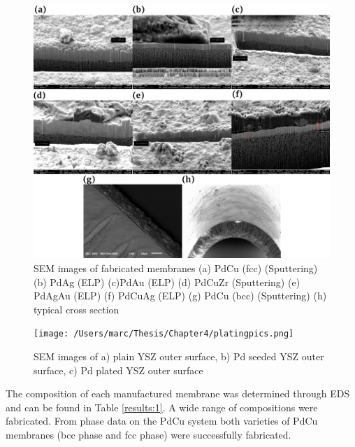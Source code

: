 \begin{figure}
    \centering
    \includegraphics[width=\linewidth, height=0.9\textheight,keepaspectratio]{figures/Semxsect.png}
    \caption{SEM images of fabricated membranes (a) PdCu (fcc) (Sputtering) (b) PdAg (ELP) (c)PdAu (ELP) (d) PdCuZr (Sputtering) (e) PdAgAu (ELP) (f) PdCuAg (ELP) (g) PdCu (bcc) (Sputtering) (h) typical cross section}
    \label{fig:1}
\end{figure}

\begin{figure}
    \centering
    \texttt{[image: /Users/marc/Thesis/Chapter4/platingpics.png]}
    \caption{SEM images of a) plain YSZ outer surface, b) Pd seeded YSZ outer surface, c) Pd plated YSZ outer surface}
    \label{platingpics}
\end{figure}
The composition of each manufactured membrane was determined through EDS and can be found in Table \ref{results:1}. A wide range of compositions were fabricated. From phase data on the PdCu system \cite{Roa2003, Nayebossadri2013} both varieties of PdCu membranes (bcc phase and fcc phase) were successfully fabricated. 


